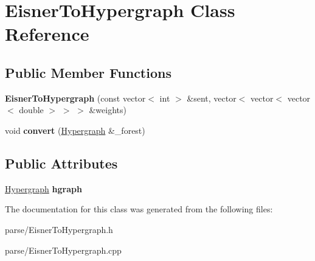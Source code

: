 \hypertarget{classEisnerToHypergraph}{
\section{EisnerToHypergraph Class Reference}
\label{classEisnerToHypergraph}
}
\subsection*{Public Member Functions}
\begin{DoxyCompactItemize}
\item 
\hypertarget{classEisnerToHypergraph_ac4c11a966298244ad74965dd35596c4c}{
{\bfseries EisnerToHypergraph} (const vector$<$ int $>$ \&sent, vector$<$ vector$<$ vector$<$ double $>$ $>$ $>$ \&weights)}
\label{classEisnerToHypergraph_ac4c11a966298244ad74965dd35596c4c}

\item 
\hypertarget{classEisnerToHypergraph_a8344d534c1b3d5f2795578c771fe4d31}{
void {\bfseries convert} (\hyperlink{classHypergraph}{Hypergraph} \&\_\-forest)}
\label{classEisnerToHypergraph_a8344d534c1b3d5f2795578c771fe4d31}

\end{DoxyCompactItemize}
\subsection*{Public Attributes}
\begin{DoxyCompactItemize}
\item 
\hypertarget{classEisnerToHypergraph_a47df02a8804876cc0e33b55681b9a2f0}{
\hyperlink{classHypergraph}{Hypergraph} {\bfseries hgraph}}
\label{classEisnerToHypergraph_a47df02a8804876cc0e33b55681b9a2f0}

\end{DoxyCompactItemize}


The documentation for this class was generated from the following files:\begin{DoxyCompactItemize}
\item 
parse/EisnerToHypergraph.h\item 
parse/EisnerToHypergraph.cpp\end{DoxyCompactItemize}
